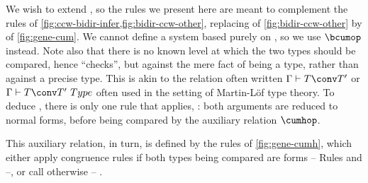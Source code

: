 We wish to extend , so the rules we present here are meant to complement
the rules of \cref{fig:ccw-bidir-infer,fig:bidir-ccw-other}, replacing 
of \cref{fig:bidir-ccw-other} by  of \cref{fig:gene-cum}.
We cannot define a system based purely on ,%
so we use  $\mathord{\bcumop}$ instead.
Note also that there is no known level at which the two types should be compared,
hence  “checks”, but against the mere
fact of being a type, rather than against a precise type. This is akin to the relation often
written $\Gamma \vdash T \conv T'$ or $\Gamma \vdash T \conv T'\ Type$ often used in the
setting of Martin-Löf type theory.
To deduce ,
there is only one rule that applies, :
both arguments are reduced to  normal forms, before being compared
by the auxiliary relation $\cumhop$.

\begin{figure*}[h]
  \ContinuedFloat
  \caption{ between reduced types}
  \label{fig:gene-cumh}
\end{figure*}

This auxiliary relation, in turn, is defined by the rules of \cref{fig:gene-cumh}, which
either apply congruence rules if both types being compared are  forms –
Rules  and  –, or call
 otherwise – .

\begin{figure*}[h]
  \ContinuedFloat
  \caption{ between types}
  \label{fig:gene-conv-ty}
\end{figure*}

